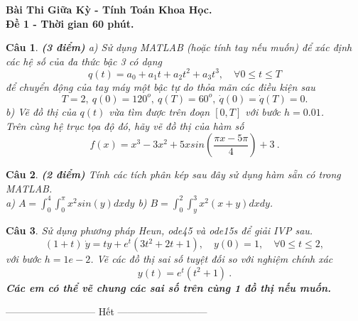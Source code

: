 \documentclass[12pt]{article}
\newtheorem{preremark}{Câu}
\newenvironment{bt}%
{\begin{preremark}\upshape}{\end{preremark}}
\begin{document}



\begin{center}
	{\bf Bài Thi Giữa Kỳ - Tính Toán Khoa Học. \\ Đề 1 - Thời gian 60 phút.
	 }
\end{center}

\begin{bt}\label{Câu 1}\textbf{(3 điểm)} %
a) Sử dụng MATLAB (hoặc tính tay nếu muốn) để xác định các hệ số của đa thức bậc 3 có dạng 
%
\[
q(t) = a_0 + a_1 t + a_2 t^2 + a_3 t^3, \quad \forall 0\leq t \leq T 
\]
%
để chuyển động của tay máy một bậc tự do thỏa mãn các điều kiện sau
%
\[
T = 2, \ q(0) = 120^o, \ q(T) = 60^o, \ \dot{q}(0) = \dot{q}(T) = 0.
\]
%
b) Vẽ đồ thị của $q(t)$ vừa tìm được trên đoạn $[0,T]$ với bước $h = 0.01$. \\
Trên cùng hệ trục tọa độ đó, hãy vẽ đồ thị của hàm số 
%
\[
f(x) = x^3 - 3x^2 + 5xsin \left(\dfrac{\pi x - 5\pi}{4} \right) + 3 \ .
\]%
\end{bt}

\begin{bt}\textbf{(2 điểm)}
Tính các tích phân kép sau đây sử dụng hàm sẵn có trong MATLAB.\\
a) $A = \int_0^4 \int_0^{\pi} x^2 sin(y) dxdy$ 
\qquad b) $B = \int_0^2 \int_y^{3} x^2(x+y) dxdy$.
\end{bt}

\begin{bt}\label{Câu 1b}
Sử dụng phương pháp Heun, ode45 và ode15s để giải IVP sau.
\begin{equation}
(1+t) \ \dot{y} = t y + e^t (3t^2+2t+1), \quad y(0) = 1, \quad \forall 0\leq t\leq 2,
\end{equation}
với bước $h = 1e-2$. Vẽ các đồ thị sai số tuyệt đối so với nghiệm chính xác 
%
\[
y(t) = e^t (t^2+1) \ .
\]
%
\textbf{Các em có thể vẽ chung các sai số trên cùng 1 đồ thị nếu muốn.}
\end{bt}

\begin{center}
	--------------------------- Hết ---------------------------
\end{center}
\end{document}
